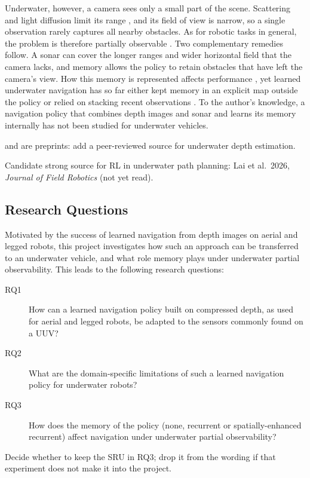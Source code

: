 Underwater, however, a camera sees only a small part of the scene. Scattering and light diffusion limit its range \parencite{massotcampos2015optical, westman2020volumetric}, and its field of view is narrow, so a single observation rarely captures all nearby obstacles. As for robotic tasks in general, the problem is therefore partially observable \parencite{ha2025learning}. Two complementary remedies follow. A sonar can cover the longer ranges and wider horizontal field that the camera lacks, and memory allows the policy to retain obstacles that have left the camera's view. How this memory is represented affects performance \parencite{morad2023popgym, yang2026spatially}, yet learned underwater navigation has so far either kept memory in an explicit map outside the policy \parencite{deowan2026unified} or relied on stacking recent observations \parencite{yang2022monocular}. To the author's knowledge, a navigation policy that combines depth images and sonar and learns its memory internally has not been studied for underwater vehicles.

\begin{todolist}
  \item \textcite{wu2025stereoadapter} and \textcite{surfslam} are preprints: add a peer-reviewed source for underwater depth estimation.
  \item Candidate strong source for RL in underwater path planning: Lai et al.\ 2026, \emph{Journal of Field Robotics} (not yet read).
\end{todolist}

\subsection{Research Questions}
\label{sec:rq}
Motivated by the success of learned navigation from depth images on aerial and legged robots, this project investigates how such an approach can be transferred to an underwater vehicle, and what role memory plays under underwater partial observability. This leads to the following research questions:
\begin{description}
    \item[RQ1] How can a learned navigation policy built on compressed depth, as used for aerial and legged robots, be adapted to the sensors commonly found on a UUV?
    \item[RQ2] What are the domain-specific limitations of such a learned navigation policy for underwater robots?
    \item[RQ3] How does the memory of the policy (none, recurrent or spatially-enhanced recurrent) affect navigation under underwater partial observability?
\end{description}
\begin{todolist}
  \item Decide whether to keep the SRU in RQ3; drop it from the wording if that experiment does not make it into the project.
\end{todolist}

